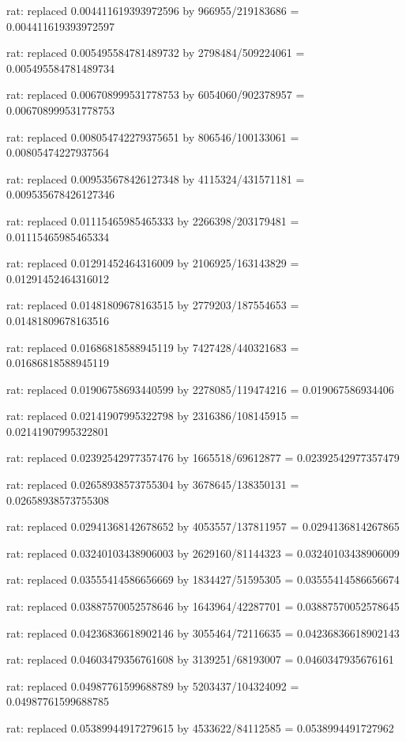 \documentclass[a4paper,10pt]{article}
\begin{document}
\begin{eulernotebook}
\begin{eulercomment}
\begin{eulercomment}
\begin{eulercomment}
\begin{eulercomment}
\begin{eulercomment}
\begin{eulercomment}
\begin{eulercomment}
\begin{eulercomment}
\begin{eulercomment}
\begin{eulercomment}
\begin{eulercomment}
\begin{eulercomment}
\begin{eulercomment}
\begin{eulercomment}
\begin{eulercomment}
\begin{eulercomment}
\begin{euleroutput}
  rat: replaced 0.004411619393972596 by 966955/219183686 = 0.004411619393972597
  
  rat: replaced 0.005495584781489732 by 2798484/509224061 = 0.005495584781489734
  
  rat: replaced 0.006708999531778753 by 6054060/902378957 = 0.006708999531778753
  
  rat: replaced 0.008054742279375651 by 806546/100133061 = 0.00805474227937564
  
  rat: replaced 0.009535678426127348 by 4115324/431571181 = 0.009535678426127346
  
  rat: replaced 0.01115465985465333 by 2266398/203179481 = 0.01115465985465334
  
  rat: replaced 0.01291452464316009 by 2106925/163143829 = 0.01291452464316012
  
  rat: replaced 0.01481809678163515 by 2779203/187554653 = 0.01481809678163516
  
  rat: replaced 0.01686818588945119 by 7427428/440321683 = 0.01686818588945119
  
  rat: replaced 0.01906758693440599 by 2278085/119474216 = 0.019067586934406
  
  rat: replaced 0.02141907995322798 by 2316386/108145915 = 0.02141907995322801
  
  rat: replaced 0.02392542977357476 by 1665518/69612877 = 0.02392542977357479
  
  rat: replaced 0.02658938573755304 by 3678645/138350131 = 0.02658938573755308
  
  rat: replaced 0.02941368142678652 by 4053557/137811957 = 0.0294136814267865
  
  rat: replaced 0.03240103438906003 by 2629160/81144323 = 0.03240103438906009
  
  rat: replaced 0.03555414586656669 by 1834427/51595305 = 0.03555414586656674
  
  rat: replaced 0.03887570052578646 by 1643964/42287701 = 0.03887570052578645
  
  rat: replaced 0.04236836618902146 by 3055464/72116635 = 0.04236836618902143
  
  rat: replaced 0.04603479356761608 by 3139251/68193007 = 0.0460347935676161
  
  rat: replaced 0.04987761599688789 by 5203437/104324092 = 0.04987761599688785
  
  rat: replaced 0.05389944917279615 by 4533622/84112585 = 0.0538994491727962
  

\end{euleroutput}
\end{eulercomment}
\end{eulercomment}
\end{eulercomment}
\end{eulercomment}
\end{eulercomment}
\end{eulercomment}
\end{eulercomment}
\end{eulercomment}
\end{eulercomment}
\end{eulercomment}
\end{eulercomment}
\end{eulercomment}
\end{eulercomment}
\end{eulercomment}
\end{eulercomment}
\end{eulercomment}
\end{eulernotebook}
\end{document}
